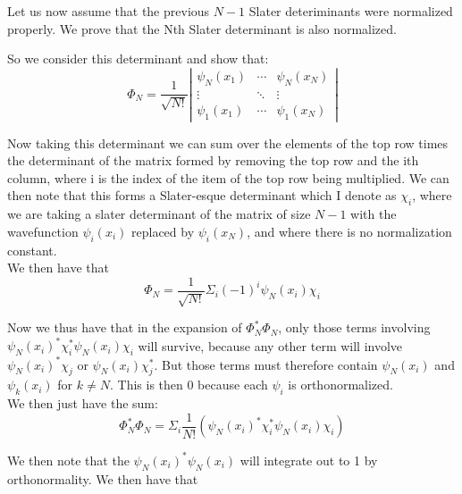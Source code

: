 \documentclass[11pt]{article} %
\begin{document}
Let us now assume that the previous $N-1$ Slater deteriminants were normalized properly. We prove that the Nth Slater determinant is also normalized.

So we consider this determinant and show that:\\

\begin{equation}
\Phi_N=\frac{1}{\sqrt{N!}} \left| \begin{array}{ccc}
\psi_N (x_1) & \cdots & \psi_N(x_N) \\
\vdots  & \ddots & \vdots  \\
\psi_1(x_1) & \cdots & \psi_1(x_N)  \end{array}\right|
\end{equation}

Now taking this determinant we can sum over the elements of the top row times the determinant of the matrix formed by removing the top row and the ith column, where i is the index of the item of the top row being multiplied. We can then note that this forms a Slater-esque determinant which I denote as $\chi_i$, where we are taking a slater determinant of the matrix of size $N-1$ with the wavefunction $\psi_i(x_i)$ replaced by $\psi_i(x_N)$, and where there is no normalization constant.\\

We then have that\\
\begin{equation} 
\Phi_N=\frac{1}{\sqrt{N!}}\Sigma_i (-1)^i \psi_N(x_i)\chi_i
\end{equation}

Now we thus have that in the expansion of $\Phi_N^* \Phi_N$, only those terms involving $\psi_N(x_i)^*\chi_i^*\psi_N(x_i)\chi_i$ will survive, because any other term will involve $\psi_N(x_i)^*\chi_j$ or $\psi_N(x_i)\chi_j^*$. But those terms must therefore contain $\psi_N(x_i)$ and $\psi_k(x_i)$ for $k \neq N$. This is then 0 because each $\psi_i$ is orthonormalized. \\

We then just have the sum:\\

\begin{equation}
\Phi_N^*\Phi_N= \Sigma_i \frac{1}{N!}(\psi_N(x_i)^*\chi_i^*\psi_N(x_i)\chi_i)
\end{equation}

We then note that the $\psi_N(x_i)^* \psi_N(x_i)$ will integrate out to 1 by orthonormality. We then have that\\
\end{document}
